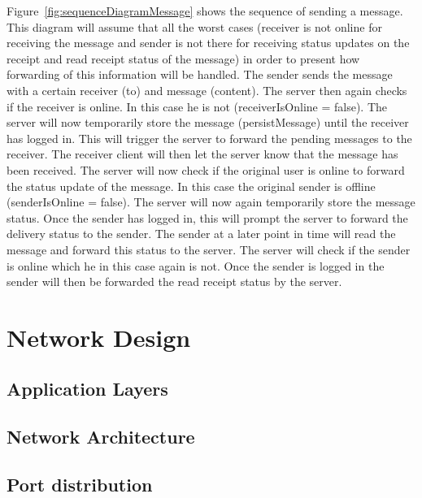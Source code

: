 Figure~\ref{fig:sequenceDiagramMessage} shows the sequence of sending a message.
This diagram will assume that all the worst cases (receiver is not online for receiving the message and sender is not
there for receiving status updates on the receipt and read receipt status of the message) in order to present how
forwarding of this information will be handled.
The sender sends the message with a certain receiver (to) and message (content).
The server then again checks if the receiver is online.
In this case he is not (receiverIsOnline = false).
The server will now temporarily store the message (persistMessage) until the receiver has logged in.
This will trigger the server to forward the pending messages to the receiver.
The receiver client will then let the server know that the message has been received.
The server will now check if the original user is online to forward the status update of the message.
In this case the original sender is offline (senderIsOnline = false).
The server will now again temporarily store the message status.
Once the sender has logged in, this will prompt the server to forward the delivery status to the sender.
The sender at a later point in time will read the message and forward this status to the server.
The server will check if the sender is online which he in this case again is not.
Once the sender is logged in the sender will then be forwarded the read receipt status by the server.


\section{Network Design}\label{sec:network-design}

\subsection{Application Layers}\label{subsec:application-layers}

\subsection{Network Architecture}\label{subsec:network-architecture}

\subsection{Port distribution}\label{subsec:port-distribution}

